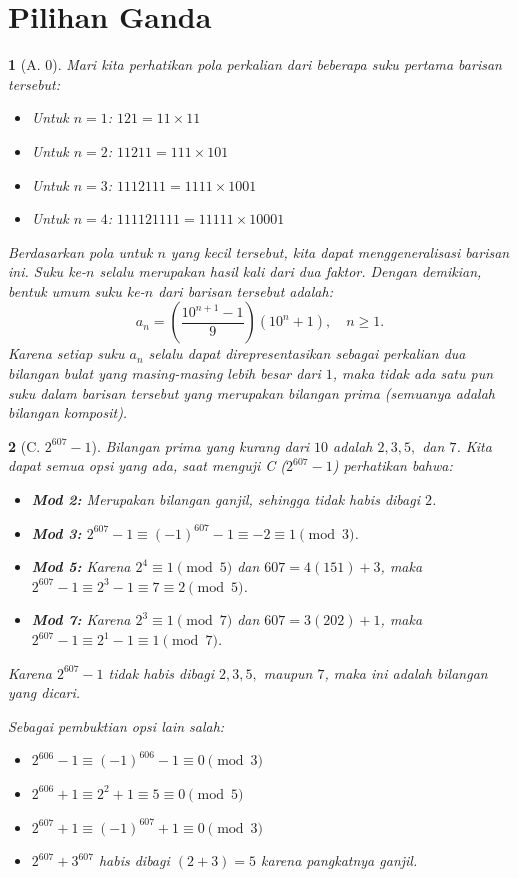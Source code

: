 \documentclass[11pt,a4paper,DIV=12]{scrartcl}
\theoremstyle{problemstyle}
\theoremstyle{answerstyle}
\newtheorem{answer}{}
\begin{document}
\section*{Pilihan Ganda}

\begin{answer}[A. 0]
  Mari kita perhatikan pola perkalian dari beberapa suku pertama barisan tersebut:
  \begin{itemize}
    \item Untuk $n=1$: $121 = 11 \times 11$
    \item Untuk $n=2$: $11211 = 111 \times 101$
    \item Untuk $n=3$: $1112111 = 1111 \times 1001$
    \item Untuk $n=4$: $111121111 = 11111 \times 10001$
  \end{itemize}
  Berdasarkan pola untuk $n$ yang kecil tersebut, kita dapat menggeneralisasi barisan ini. Suku ke-$n$ selalu merupakan hasil kali dari dua faktor.
  Dengan demikian, bentuk umum suku ke-$n$ dari barisan tersebut adalah:
  $$ a_n = \left( \frac{10^{n+1}-1}{9} \right) (10^n+1), \quad n \ge 1. $$
  Karena setiap suku $a_n$ selalu dapat direpresentasikan sebagai perkalian dua bilangan bulat yang masing-masing lebih besar dari $1$, maka tidak ada satu pun suku dalam barisan tersebut yang merupakan bilangan prima (semuanya adalah bilangan komposit).
\end{answer}

\begin{answer}[C. $2^{607}-1$]
  Bilangan prima yang kurang dari $10$ adalah $2, 3, 5,$ dan $7$. Kita dapat semua opsi yang ada, saat menguji C ($2^{607}-1$) perhatikan bahwa:
  \begin{itemize}
    \item \textbf{Mod 2:} Merupakan bilangan ganjil, sehingga tidak habis dibagi $2$.
    \item \textbf{Mod 3:} $2^{607}-1 \equiv (-1)^{607}-1 \equiv -2 \equiv 1 \pmod 3$.
    \item \textbf{Mod 5:} Karena $2^4 \equiv 1 \pmod 5$ dan $607 = 4(151)+3$, maka $2^{607}-1 \equiv 2^3-1 \equiv 7 \equiv 2 \pmod 5$.
    \item \textbf{Mod 7:} Karena $2^3 \equiv 1 \pmod 7$ dan $607 = 3(202)+1$, maka $2^{607}-1 \equiv 2^1-1 \equiv 1 \pmod 7$.
  \end{itemize}

  Karena $2^{607}-1$ tidak habis dibagi $2, 3, 5,$ maupun $7$, maka ini adalah bilangan yang dicari.

  Sebagai pembuktian opsi lain salah:
  \begin{itemize}
    \item $2^{606}-1 \equiv (-1)^{606}-1 \equiv 0 \pmod 3$
    \item $2^{606}+1 \equiv 2^2+1 \equiv 5 \equiv 0 \pmod 5$
    \item $2^{607}+1 \equiv (-1)^{607}+1 \equiv 0 \pmod 3$
    \item $2^{607}+3^{607}$ habis dibagi $(2+3)=5$ karena pangkatnya ganjil.
  \end{itemize}
\end{answer}
\end{document}
